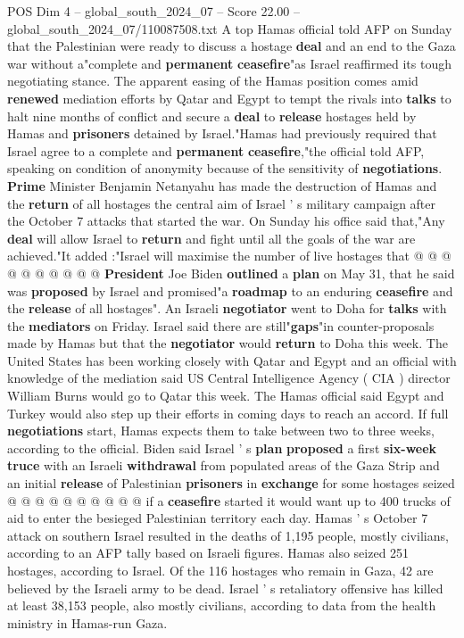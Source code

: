\begin{textsample}{POS Dim 4 – global\_south\_2024\_07 – Score 22.00 – global\_south\_2024\_07/110087508.txt}  \label{ex:f4_pos_118}
A top Hamas official told AFP on Sunday that the Palestinian were ready to discuss a hostage \textbf{deal} and an end to the Gaza war without a"complete and \textbf{permanent} \textbf{ceasefire}"as Israel reaffirmed its tough negotiating stance.
The apparent easing of the Hamas position comes amid \textbf{renewed} mediation efforts by Qatar and Egypt to tempt the rivals into \textbf{talks} to halt nine months of conflict and secure a \textbf{deal} to \textbf{release} hostages held by Hamas and \textbf{prisoners} detained by Israel."Hamas had previously required that Israel agree to a complete and \textbf{permanent} \textbf{ceasefire},"the official told AFP, speaking on condition of anonymity because of the sensitivity of \textbf{negotiations}. \textbf{Prime} Minister Benjamin Netanyahu has made the destruction of Hamas and the \textbf{return} of all hostages the central aim of Israel ' s military campaign after the October 7 attacks that started the war.
On Sunday his office said that,"Any \textbf{deal} will allow Israel to \textbf{return} and fight until all the goals of the war are achieved."It added :"Israel will maximise the number of live hostages that @ @ @ @ @ @ @ @ @ @ \textbf{President} Joe Biden \textbf{outlined} a \textbf{plan} on May 31, that he said was \textbf{proposed} by Israel and promised"a \textbf{roadmap} to an enduring \textbf{ceasefire} and the \textbf{release} of all hostages".
An Israeli \textbf{negotiator} went to Doha for \textbf{talks} with the \textbf{mediators} on Friday.
Israel said there are still"\textbf{gaps}"in counter-proposals made by Hamas but that the \textbf{negotiator} would \textbf{return} to Doha this week.
The United States has been working closely with Qatar and Egypt and an official with knowledge of the mediation said US Central Intelligence Agency ( CIA ) director William Burns would go to Qatar this week.
The Hamas official said Egypt and Turkey would also step up their efforts in coming days to reach an accord.
If full \textbf{negotiations} start, Hamas expects them to take between two to three weeks, according to the official.
Biden said Israel ' s \textbf{plan} \textbf{proposed} a first \textbf{six-week} \textbf{truce} with an Israeli \textbf{withdrawal} from populated areas of the Gaza Strip and an initial \textbf{release} of Palestinian \textbf{prisoners} in \textbf{exchange} for some hostages seized @ @ @ @ @ @ @ @ @ @ if a \textbf{ceasefire} started it would want up to 400 trucks of aid to enter the besieged Palestinian territory each day.
Hamas ' s October 7 attack on southern Israel resulted in the deaths of 1,195 people, mostly civilians, according to an AFP tally based on Israeli figures.
Hamas also seized 251 hostages, according to Israel.
Of the 116 hostages who remain in Gaza, 42 are believed by the Israeli army to be dead.
Israel ' s retaliatory offensive has killed at least 38,153 people, also mostly civilians, according to data from the health ministry in Hamas-run Gaza.

\end{textsample}

